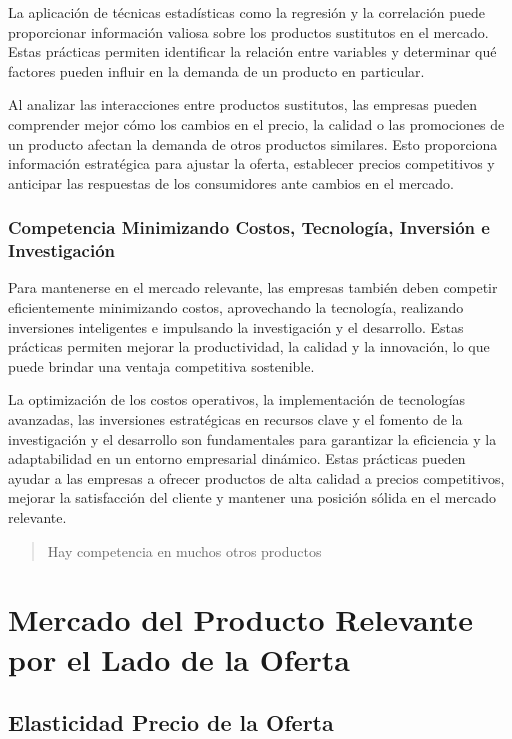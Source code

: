 \documentclass[
  doc,
  floatsintext,
  longtable,
  a4paper,
  nolmodern,
  notxfonts,
  notimes,
  12pt,
  colorlinks=true,linkcolor=blue,citecolor=blue,urlcolor=blue]{apa7}
\begin{document}
La aplicación de técnicas estadísticas como la regresión y la
correlación puede proporcionar información valiosa sobre los productos
sustitutos en el mercado. Estas prácticas permiten identificar la
relación entre variables y determinar qué factores pueden influir en la
demanda de un producto en particular.

Al analizar las interacciones entre productos sustitutos, las empresas
pueden comprender mejor cómo los cambios en el precio, la calidad o las
promociones de un producto afectan la demanda de otros productos
similares. Esto proporciona información estratégica para ajustar la
oferta, establecer precios competitivos y anticipar las respuestas de
los consumidores ante cambios en el mercado.

\subsubsection{Competencia Minimizando Costos, Tecnología, Inversión e
Investigación}\label{competencia-minimizando-costos-tecnologuxeda-inversiuxf3n-e-investigaciuxf3n}

Para mantenerse en el mercado relevante, las empresas también deben
competir eficientemente minimizando costos, aprovechando la tecnología,
realizando inversiones inteligentes e impulsando la investigación y el
desarrollo. Estas prácticas permiten mejorar la productividad, la
calidad y la innovación, lo que puede brindar una ventaja competitiva
sostenible.

La optimización de los costos operativos, la implementación de
tecnologías avanzadas, las inversiones estratégicas en recursos clave y
el fomento de la investigación y el desarrollo son fundamentales para
garantizar la eficiencia y la adaptabilidad en un entorno empresarial
dinámico. Estas prácticas pueden ayudar a las empresas a ofrecer
productos de alta calidad a precios competitivos, mejorar la
satisfacción del cliente y mantener una posición sólida en el mercado
relevante.

\begin{quote}
Hay competencia en muchos otros productos
\end{quote}

\section{Mercado del Producto Relevante por el Lado de la
Oferta}\label{mercado-del-producto-relevante-por-el-lado-de-la-oferta}

\subsection{Elasticidad Precio de la
Oferta}\label{elasticidad-precio-de-la-oferta}
\end{document}
